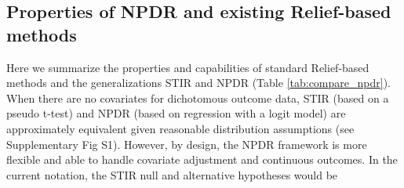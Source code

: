 \documentclass[10pt]{article}
\begin{document}
% 

\subsection{Properties of NPDR and existing Relief-based methods}
Here we summarize the properties and capabilities of standard Relief-based methods\cite{urbanowicz17b} and the generalizations STIR\cite{stir} and NPDR (Table \ref{tab:compare_npdr}).
When there are no covariates for dichotomous outcome data, STIR (based on a pseudo t-test) and NPDR (based on regression with a logit model) are approximately equivalent given reasonable distribution assumptions (see Supplementary Fig S1).
However, by design, the NPDR framework is more flexible and able to handle covariate adjustment and continuous outcomes.
In the current notation, the STIR null and alternative hypotheses would be
\end{document}
